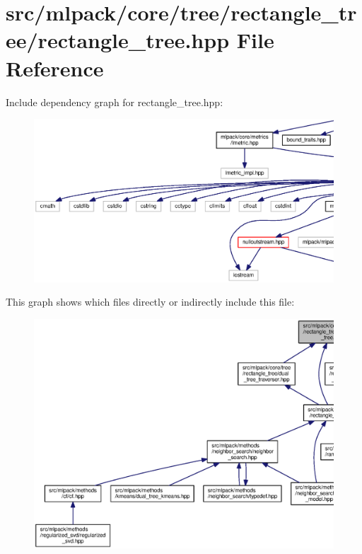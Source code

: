 \section{src/mlpack/core/tree/rectangle\+\_\+tree/rectangle\+\_\+tree.hpp File Reference}
\label{rectangle__tree_2rectangle__tree_8hpp}
Include dependency graph for rectangle\+\_\+tree.\+hpp\+:
\nopagebreak
\begin{figure}[H]
\begin{center}
\leavevmode
\includegraphics[width=350pt]{rectangle__tree_2rectangle__tree_8hpp__incl}
\end{center}
\end{figure}
This graph shows which files directly or indirectly include this file\+:
\nopagebreak
\begin{figure}[H]
\begin{center}
\leavevmode
\includegraphics[width=350pt]{rectangle__tree_2rectangle__tree_8hpp__dep__incl}
\end{center}
\end{figure}

